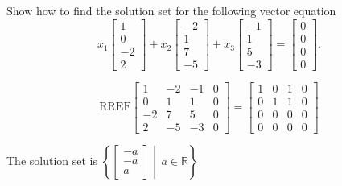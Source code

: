 
\begin{exerciseStatement}


Show how to find the solution set for the following vector equation \[ x_{1} \left[\begin{array}{c}
1 \\
0 \\
-2 \\
2
\end{array}\right] + x_{2} \left[\begin{array}{c}
-2 \\
1 \\
7 \\
-5
\end{array}\right] + x_{3} \left[\begin{array}{c}
-1 \\
1 \\
5 \\
-3
\end{array}\right] = \left[\begin{array}{c}
0 \\
0 \\
0 \\
0
\end{array}\right] .\]


\end{exerciseStatement}
    
\begin{exerciseAnswer} 
\[\mathrm{RREF} \left[\begin{array}{ccc|c}
1 & -2 & -1 & 0 \\
0 & 1 & 1 & 0 \\
-2 & 7 & 5 & 0 \\
2 & -5 & -3 & 0
\end{array}\right]  =  \left[\begin{array}{ccc|c}
1 & 0 & 1 & 0 \\
0 & 1 & 1 & 0 \\
0 & 0 & 0 & 0 \\
0 & 0 & 0 & 0
\end{array}\right] \]

The solution set is \( \left\{ \left[\begin{array}{c}
-a \\
-a \\
a
\end{array}\right] \middle|\,a\in\mathbb{R}\right\} \)


\end{exerciseAnswer}
    

